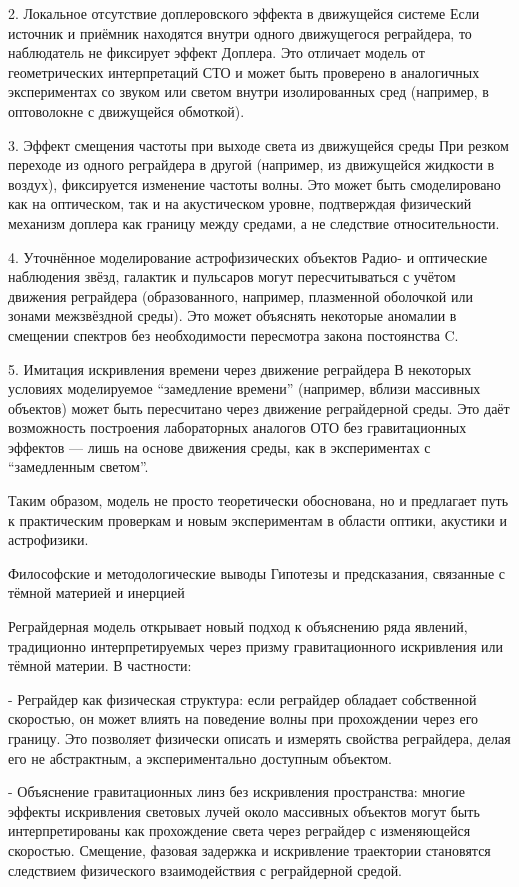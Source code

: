 \documentclass[12pt]{article}
\begin{document}
2. Локальное отсутствие доплеровского эффекта в движущейся системе
Если источник и приёмник находятся внутри одного движущегося реграйдера, то наблюдатель не фиксирует эффект Доплера. Это отличает модель от геометрических интерпретаций СТО и может быть проверено в аналогичных экспериментах со звуком или светом внутри изолированных сред (например, в оптоволокне с движущейся обмоткой).

3. Эффект смещения частоты при выходе света из движущейся среды
При резком переходе из одного реграйдера в другой (например, из движущейся жидкости в воздух), фиксируется изменение частоты волны. Это может быть смоделировано как на оптическом, так и на акустическом уровне, подтверждая физический механизм доплера как границу между средами, а не следствие относительности.

4. Уточнённое моделирование астрофизических объектов
Радио- и оптические наблюдения звёзд, галактик и пульсаров могут пересчитываться с учётом движения реграйдера (образованного, например, плазменной оболочкой или зонами межзвёздной среды). Это может объяснять некоторые аномалии в смещении спектров без необходимости пересмотра закона постоянства C.

5. Имитация искривления времени через движение реграйдера
В некоторых условиях моделируемое “замедление времени” (например, вблизи массивных объектов) может быть пересчитано через движение реграйдерной среды. Это даёт возможность построения лабораторных аналогов ОТО без гравитационных эффектов — лишь на основе движения среды, как в экспериментах с “замедленным светом”.

Таким образом, модель не просто теоретически обоснована, но и предлагает путь к практическим проверкам и новым экспериментам в области оптики, акустики и астрофизики.


Философские и методологические выводы
Гипотезы и предсказания, связанные с тёмной материей и инерцией

Реграйдерная модель открывает новый подход к объяснению ряда явлений, традиционно интерпретируемых через призму гравитационного искривления или тёмной материи. В частности:

- Реграйдер как физическая структура: если реграйдер обладает собственной скоростью, он может влиять на поведение волны при прохождении через его границу. Это позволяет физически описать и измерять свойства реграйдера, делая его не абстрактным, а экспериментально доступным объектом.

- Объяснение гравитационных линз без искривления пространства: многие эффекты искривления световых лучей около массивных объектов могут быть интерпретированы как прохождение света через реграйдер с изменяющейся скоростью. Смещение, фазовая задержка и искривление траектории становятся следствием физического взаимодействия с реграйдерной средой.
\end{document}

